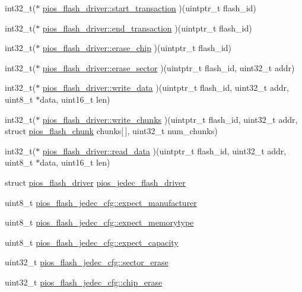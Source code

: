 \begin{DoxyCompactItemize}
\item 
int32\-\_\-t($\ast$ \hyperlink{group___p_i_o_s___f_l_a_s_h_ga3128721bfc5d4b157f9c8866d10d80f0}{pios\-\_\-flash\-\_\-driver\-::start\-\_\-transaction} )(uintptr\-\_\-t flash\-\_\-id)
\item 
int32\-\_\-t($\ast$ \hyperlink{group___p_i_o_s___f_l_a_s_h_ga775db43adcb0c42ede668aef36016301}{pios\-\_\-flash\-\_\-driver\-::end\-\_\-transaction} )(uintptr\-\_\-t flash\-\_\-id)
\item 
int32\-\_\-t($\ast$ \hyperlink{group___p_i_o_s___f_l_a_s_h_ga38768b3295a563897e91191bfead95b5}{pios\-\_\-flash\-\_\-driver\-::erase\-\_\-chip} )(uintptr\-\_\-t flash\-\_\-id)
\item 
int32\-\_\-t($\ast$ \hyperlink{group___p_i_o_s___f_l_a_s_h_ga91676d432517e3a2ea7303a07cd1bde3}{pios\-\_\-flash\-\_\-driver\-::erase\-\_\-sector} )(uintptr\-\_\-t flash\-\_\-id, uint32\-\_\-t addr)
\item 
int32\-\_\-t($\ast$ \hyperlink{group___p_i_o_s___f_l_a_s_h_ga019d8ac125523464c1068f1170852dd0}{pios\-\_\-flash\-\_\-driver\-::write\-\_\-data} )(uintptr\-\_\-t flash\-\_\-id, uint32\-\_\-t addr, uint8\-\_\-t $\ast$data, uint16\-\_\-t len)
\item 
int32\-\_\-t($\ast$ \hyperlink{group___p_i_o_s___f_l_a_s_h_ga5bac463e83aa46ce41c151c74ff8467b}{pios\-\_\-flash\-\_\-driver\-::write\-\_\-chunks} )(uintptr\-\_\-t flash\-\_\-id, uint32\-\_\-t addr, struct \hyperlink{structpios__flash__chunk}{pios\-\_\-flash\-\_\-chunk} chunks\mbox{[}$\,$\mbox{]}, uint32\-\_\-t num\-\_\-chunks)
\item 
int32\-\_\-t($\ast$ \hyperlink{group___p_i_o_s___f_l_a_s_h_ga5499ff7cdf896098a6eb43f2f32dc40a}{pios\-\_\-flash\-\_\-driver\-::read\-\_\-data} )(uintptr\-\_\-t flash\-\_\-id, uint32\-\_\-t addr, uint8\-\_\-t $\ast$data, uint16\-\_\-t len)
\item 
struct \hyperlink{structpios__flash__driver}{pios\-\_\-flash\-\_\-driver} \hyperlink{group___p_i_o_s___f_l_a_s_h_gab3923a09f07a535164fd799434276f27}{pios\-\_\-jedec\-\_\-flash\-\_\-driver}
\item 
uint8\-\_\-t \hyperlink{group___p_i_o_s___f_l_a_s_h_gab7416f66a2c392cc5a27e12cbf4e9a07}{pios\-\_\-flash\-\_\-jedec\-\_\-cfg\-::expect\-\_\-manufacturer}
\item 
uint8\-\_\-t \hyperlink{group___p_i_o_s___f_l_a_s_h_gacfb5714f6cef5d14a78a38ebe2369b43}{pios\-\_\-flash\-\_\-jedec\-\_\-cfg\-::expect\-\_\-memorytype}
\item 
uint8\-\_\-t \hyperlink{group___p_i_o_s___f_l_a_s_h_ga33911ac74387cebdbc4bb2fe3d5541a6}{pios\-\_\-flash\-\_\-jedec\-\_\-cfg\-::expect\-\_\-capacity}
\item 
uint32\-\_\-t \hyperlink{group___p_i_o_s___f_l_a_s_h_gae824eeb4a55e49fa84a48f1d43ae788c}{pios\-\_\-flash\-\_\-jedec\-\_\-cfg\-::sector\-\_\-erase}
\item 
uint32\-\_\-t \hyperlink{group___p_i_o_s___f_l_a_s_h_ga24dfbff52821d42480cde7686f07e956}{pios\-\_\-flash\-\_\-jedec\-\_\-cfg\-::chip\-\_\-erase}
\end{DoxyCompactItemize}


